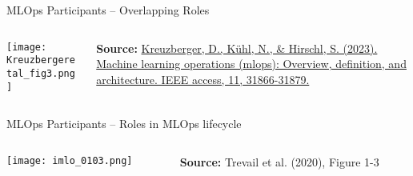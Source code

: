\documentclass[ignorenonframetext,xcolor=x11names]{beamer}
\begin{document}
\begin{frame}{MLOps Participants -- Overlapping Roles}
\begin{columns}
\begin{column}{.9\textwidth}
\centering
\texttt{[image: Kreuzbergeretal\_fig3.png]} 
\end{column}
\begin{column}{.15\textwidth}
\tiny \textbf{Source:} \href{https://ieeexplore.ieee.org/abstract/document/10081336}{Kreuzberger, D., K\"uhl, N., \& Hirschl, S. (2023). Machine learning operations (mlops): Overview, definition, and architecture. IEEE access, 11, 31866-31879.}
\end{column}
\end{columns}
\end{frame}

\begin{frame}{MLOps Participants -- Roles in MLOps lifecycle}
\begin{columns}
\begin{column}{.8\textwidth}
\centering
\texttt{[image: imlo\_0103.png]}
\end{column}
\begin{column}{.2\textwidth}
\tiny \textbf{Source:} Trevail et al. (2020), Figure 1-3
\end{column}
\end{columns}
\end{frame}
\end{document}
